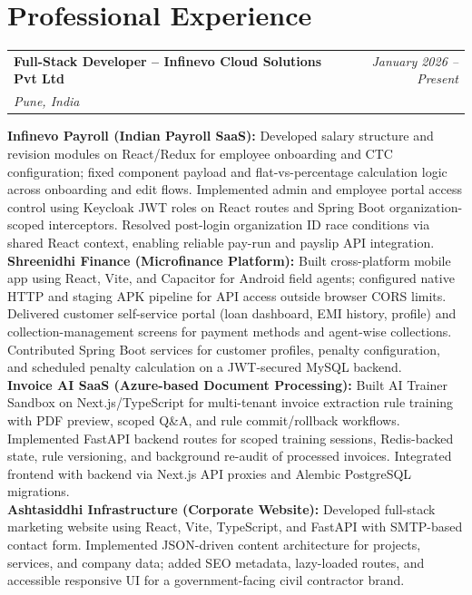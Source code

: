 \documentclass[a4paper,11pt]{article}
\makeatletter
\newcommand{\resumeProject}[4]{
\vspace{0.5mm}\item
\begin{tabular*}{0.98\textwidth}[t]{l@{\extracolsep{\fill}}r}
    \textbf{#1} & \textit{\footnotesize{#3}} \\
    \footnotesize{\textit{#2}} & \footnotesize{#4}
\end{tabular*}
\vspace{-2.4mm}
}
\makeatother
\begin{document}
\section{\textbf{Professional Experience}}

\resumeProject
{Full-Stack Developer -- Infinevo Cloud Solutions Pvt Ltd}
{Pune, India}
{January 2026 -- Present}{}
\vspace{-0.5mm}
\begin{itemize}[leftmargin=0.05in, label={}]
\small{\item{
    \textbf{Infinevo Payroll (Indian Payroll SaaS):} Developed salary structure and revision modules on React/Redux for employee onboarding and CTC configuration; fixed component payload and flat-vs-percentage calculation logic across onboarding and edit flows. Implemented admin and employee portal access control using Keycloak JWT roles on React routes and Spring Boot organization-scoped interceptors. Resolved post-login organization ID race conditions via shared React context, enabling reliable pay-run and payslip API integration. \\
    \textbf{Shreenidhi Finance (Microfinance Platform):} Built cross-platform mobile app using React, Vite, and Capacitor for Android field agents; configured native HTTP and staging APK pipeline for API access outside browser CORS limits. Delivered customer self-service portal (loan dashboard, EMI history, profile) and collection-management screens for payment methods and agent-wise collections. Contributed Spring Boot services for customer profiles, penalty configuration, and scheduled penalty calculation on a JWT-secured MySQL backend. \\
    \textbf{Invoice AI SaaS (Azure-based Document Processing):} Built AI Trainer Sandbox on Next.js/TypeScript for multi-tenant invoice extraction rule training with PDF preview, scoped Q\&A, and rule commit/rollback workflows. Implemented FastAPI backend routes for scoped training sessions, Redis-backed state, rule versioning, and background re-audit of processed invoices. Integrated frontend with backend via Next.js API proxies and Alembic PostgreSQL migrations. \\
    \textbf{Ashtasiddhi Infrastructure (Corporate Website):} Developed full-stack marketing website using React, Vite, TypeScript, and FastAPI with SMTP-based contact form. Implemented JSON-driven content architecture for projects, services, and company data; added SEO metadata, lazy-loaded routes, and accessible responsive UI for a government-facing civil contractor brand.
}}
\end{itemize}
\end{document}
